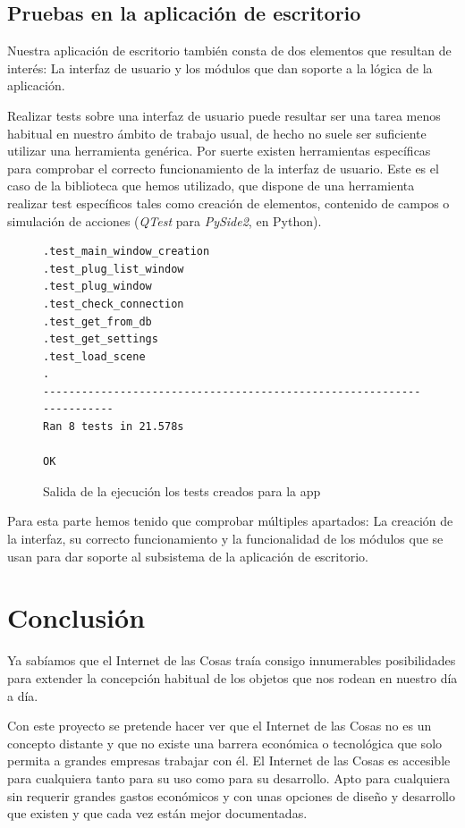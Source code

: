 \documentclass[a4paper,10pt]{article}
\begin{document}
\newpage

\subsection{Pruebas en la aplicación de escritorio}

Nuestra aplicación de escritorio también consta de dos elementos que
resultan de interés: La interfaz de usuario y los módulos que dan
soporte a la lógica de la aplicación.

Realizar tests sobre una interfaz de usuario puede resultar ser una
tarea menos habitual en nuestro ámbito de trabajo usual, de hecho no
suele ser suficiente utilizar una herramienta genérica. Por suerte
existen herramientas específicas para comprobar el correcto
funcionamiento de la interfaz de usuario. Este es el caso de la
biblioteca que hemos utilizado, que dispone de una herramienta
realizar test específicos tales como creación de elementos, contenido
de campos o simulación de acciones (\textit{QTest} para
\textit{PySide2}, en Python).


\begin{figure}[H]
\begin{lstlisting}
.test_main_window_creation
.test_plug_list_window
.test_plug_window
.test_check_connection
.test_get_from_db
.test_get_settings
.test_load_scene
.
----------------------------------------------------------------------
Ran 8 tests in 21.578s

OK

\end{lstlisting}

\caption{Salida de la ejecución los tests creados para la app}
\end{figure}

Para esta parte hemos tenido que comprobar múltiples apartados: La
creación de la interfaz, su correcto funcionamiento y la funcionalidad
de los módulos que se usan para dar soporte al subsistema de la
aplicación de escritorio.


\newpage

\section{Conclusión}\label{conclusion}

Ya sabíamos que el Internet de las Cosas traía consigo innumerables
posibilidades para extender la concepción habitual de los objetos que
nos rodean en nuestro día a día.

Con este proyecto se pretende hacer ver que el Internet de las Cosas
no es un concepto distante y que no existe una barrera económica o
tecnológica que solo permita a grandes empresas trabajar con él. El
Internet de las Cosas es accesible para cualquiera tanto para su uso
como para su desarrollo. Apto para cualquiera sin requerir grandes
gastos económicos y con unas opciones de diseño y desarrollo que
existen y que cada vez están mejor documentadas.
\end{document}
